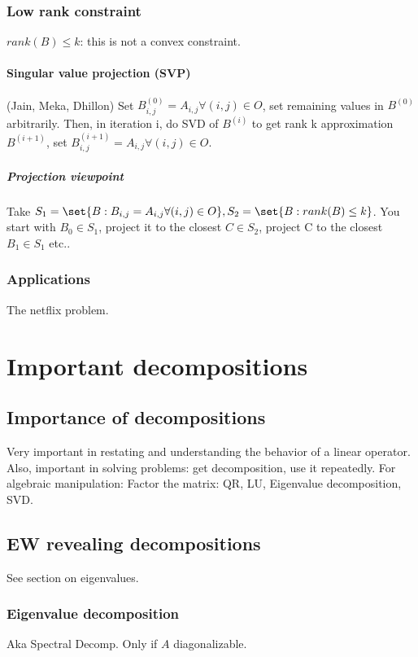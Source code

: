 \documentclass[oneside, article]{memoir}
\begin{document}
\subsection{Low rank constraint}
$rank(B) \leq k$: this is not a convex constraint.

\subsubsection{Singular value projection (SVP)}
(Jain, Meka, Dhillon) Set $B^{(0)}_{i,j} = A_{i,j} \forall (i,j) \in O$, set remaining values in $B^{(0)}$ arbitrarily. Then, in iteration i, do SVD of $B^{(i)}$ to get rank k approximation $B^{(i+1)}$, set $B^{(i+1)}_{i,j} = A_{i,j} \forall (i,j) \in O$.

\paragraph*{Projection viewpoint}
Take $S_1 = \set{B:B_{i,j} = A_{i,j} \forall (i,j) \in O},\\
 S_2 = \set{B:rank(B)\leq k}$. You start with $B_0 \in S_1$, project it to the closest $C \in S_2$, project C to the closest $B_1 \in S_1$ etc..


\subsection{Applications}
The netflix problem.

\chapter{Important decompositions}
\section{Importance of decompositions}
Very important in restating and understanding the behavior of a linear operator. Also, important in solving problems: get decomposition, use it repeatedly. For algebraic manipulation: Factor the matrix: QR, LU, Eigenvalue decomposition, SVD.

\section{EW revealing decompositions}
See section on eigenvalues.

\subsection{Eigenvalue decomposition}
Aka Spectral Decomp. Only if $A$ diagonalizable.
\end{document}

